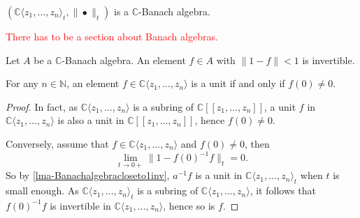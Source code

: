 \begin{proposition}\label{prop-CzztBanachalg}
    $(\mathbb{C}\langle z_1,\ldots,z_n\rangle_t,\|\bullet\|_t)$ is a $\mathbb{C}$-Banach algebra.
\end{proposition}

\textcolor{red}{There has to be a section about Banach algebras.}
\begin{lemma}\label{lma-Banachalgebracloseto1inv}
    Let $A$ be a $\mathbb{C}$-Banach algebra. An element $f\in A$ with $\|1-f\|<1$ is invertible.
\end{lemma}

\begin{lemma}\label{lma-unitsinconvpowerseries}
    For any $n\in \mathbb{N}$, an element $f\in \mathbb{C}\langle z_1,\ldots,z_n \rangle$ is a unit if and only if $f(0)\neq 0$.
\end{lemma}
\begin{proof}
    In fact, as $\mathbb{C}\langle z_1,\ldots,z_n \rangle$ is a subring of $\mathbb{C}[[z_1,\ldots,z_n]]$, a unit $f$ in $\mathbb{C}\langle z_1,\ldots,z_n \rangle$ is also a unit in $\mathbb{C}[[z_1,\ldots,z_n]]$, hence $f(0)\neq 0$.

    Conversely, assume that $f\in \mathbb{C}\langle z_1,\ldots,z_n \rangle$ and $f(0)\neq 0$, then
    \[
        \lim_{t\to 0+}\|1-f(0)^{-1}f\|_t=0.
    \]
    So by \cref{lma-Banachalgebracloseto1inv}, $a^{-1}f$ is a unit in $\mathbb{C}\langle z_1,\ldots,z_n \rangle_t$ when $t$ is small enough. As $\mathbb{C}\langle z_1,\ldots,z_n \rangle_t$ is a subring of $\mathbb{C}\langle z_1,\ldots,z_n \rangle$, it follows that $f(0)^{-1}f$ is invertible in $\mathbb{C}\langle z_1,\ldots,z_n \rangle$, hence so is $f$.
\end{proof}



